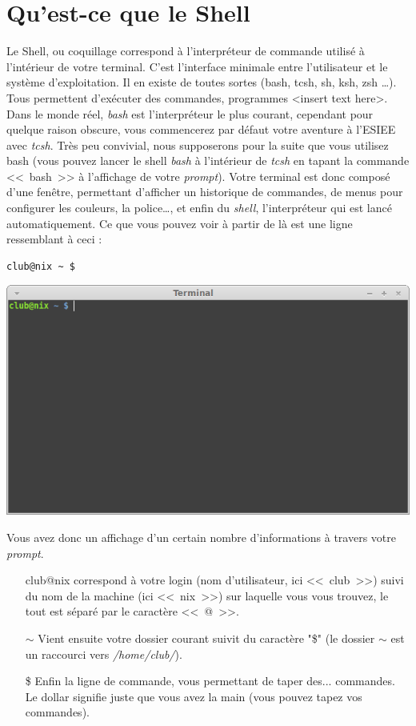 \documentclass[french, a4paper, 12pt, titlepage]{article}
\begin{document}
\section{Qu'est-ce que le Shell}
Le Shell, ou coquillage correspond à l'interpréteur de commande utilisé à l'intérieur de votre terminal.
C'est l'interface minimale entre l'utilisateur et le système d'exploitation.
Il en existe de toutes sortes (bash, tcsh, sh, ksh, zsh \dots). Tous permettent d'exécuter des commandes, programmes <insert text here>.
Dans le monde réel, \emph{bash} est l'interpréteur le plus courant, cependant pour quelque raison obscure, vous commencerez par défaut votre aventure à l'ESIEE avec \emph{tcsh}.
Très peu convivial, nous supposerons pour la suite que vous utilisez bash (vous pouvez lancer le shell \emph{bash} à l'intérieur de \emph{tcsh} en tapant la commande <<~bash~>> à l'affichage de votre \emph{prompt}).
Votre terminal est donc composé d'une fenêtre, permettant d'afficher un historique de commandes, de menus pour configurer les couleurs, la police\dots, et enfin du \emph{shell}, l'interpréteur qui est lancé automatiquement.
Ce que vous pouvez voir à partir de là est une ligne ressemblant à ceci :
\begin{lstlisting}
club@nix ~ $
\end{lstlisting}
\begin{center}
\includegraphics[scale=0.42]{Images/terminal}
\end{center}
Vous avez donc un affichage d'un certain nombre d'informations à travers votre \emph{prompt}.
\begin{enumerate}
\item[club@nix] correspond à votre login (nom d'utilisateur, ici <<~club~>>) suivi du nom de la machine (ici <<~nix~>>) sur laquelle vous vous trouvez, le tout est séparé par le caractère <<~@~>>.
\item[$\sim$] Vient ensuite votre dossier courant suivit du caractère "\$" (le dossier $\sim$ est un raccourci vers \emph{/home/club/}).
\item[\$] Enfin la ligne de commande, vous permettant de taper des... commandes. Le dollar signifie juste que vous avez la main (vous pouvez tapez vos commandes).
\end{enumerate}
\end{document}
